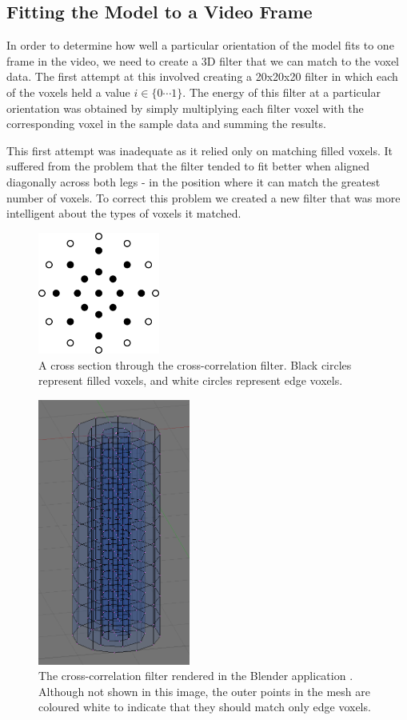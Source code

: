 \documentclass[a4paper,12pt]{article}
\begin{document}
\subsection{Fitting the Model to a Video Frame}

In order to determine how well a particular orientation of the model fits to one frame in the video, we need to create a 3D filter that we can match to the voxel data.
The first attempt at this involved creating a 20x20x20 filter in which each of the voxels held a value $i \in \{0 \cdots 1\}$.
The energy of this filter at a particular orientation was obtained by simply multiplying each filter voxel with the corresponding voxel in the sample data and summing the results.

This first attempt was inadequate as it relied only on matching filled voxels.
It suffered from the problem that the filter tended to fit better when aligned diagonally across both legs - in the position where it can match the greatest number of voxels.
To correct this problem we created a new filter that was more intelligent about the types of voxels it matched.

\begin{figure}[p]
	\centering
	\includegraphics[width=4cm]{../interim/improvedfilter.png}
	\caption{A cross section through the cross-correlation filter.
		Black circles represent filled voxels, and white circles represent edge voxels.}
	\label{ImprovedFilterCross}
\end{figure}

\begin{figure}[p]
	\centering
	\includegraphics[width=5cm]{../report/thighmodel.png}
	\caption{The cross-correlation filter rendered in the Blender application \cite{Blender}.
		Although not shown in this image, the outer points in the mesh are coloured white to indicate that they should
		match only edge voxels.}
	\label{ImprovedFilter}
\end{figure}
\end{document}

